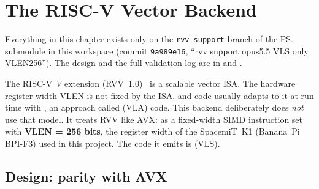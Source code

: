 \chapter{The RISC-V Vector Backend}\label{r01:ch:rvv-backend}

\begin{forkonly}
  Everything in this chapter exists only on the \texttt{rvv-support} branch of the
  \ps{} submodule in this workspace (commit \texttt{9a989e16}, ``rvv support opus5.5 VLS
  only VLEN256''). The design and the full validation log are in
   and
  .
\end{forkonly}

The RISC-V \emph{V} extension (RVV~1.0)~\cite{rvv-spec} is a scalable vector ISA. The
hardware register width VLEN is not fixed by the ISA, and code usually adapts to it at
run time with , an approach called  (VLA)
code. This backend deliberately does \emph{not} use that model. It treats RVV like AVX:
as a fixed-width SIMD instruction set with \textbf{VLEN = 256 bits}, the register width
of the SpacemiT~K1 (Banana~Pi BPI-F3) used in this project. The code it emits is
 (VLS).

\section{Design: parity with AVX}

